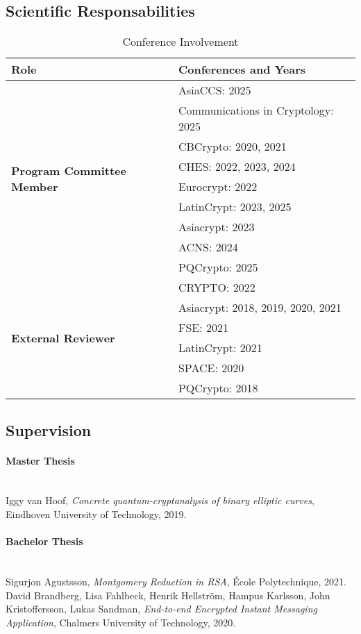 \subsection*{Scientific Responsabilities}
\begin{table}[h]
    \centering
     \caption{Conference Involvement}
    \label{tab:conference_involvement}
    \renewcommand{\arraystretch}{1.3}
    \setlength{\tabcolsep}{10pt}
    \begin{tabular}{l|l}
        \toprule
        \textbf{Role} & \textbf{Conferences and Years} \\
        \midrule
        \multirow{9}{*}{\textbf{Program Committee Member}} & AsiaCCS: 2025 \\
        & Communications in Cryptology: 2025 \\
        & CBCrypto: 2020, 2021 \\
        & CHES: 2022, 2023, 2024 \\
        & Eurocrypt: 2022 \\
        & LatinCrypt: 2023, 2025 \\
        & Asiacrypt: 2023 \\
        & ACNS: 2024 \\
        & PQCrypto: 2025 \\
        \midrule
        \multirow{6}{*}{\textbf{External Reviewer}} & CRYPTO: 2022 \\
        & Asiacrypt: 2018, 2019, 2020, 2021 \\
        & FSE: 2021 \\
        & LatinCrypt: 2021 \\
        & SPACE: 2020 \\
        & PQCrypto: 2018 \\
        \bottomrule
    \end{tabular}
\end{table}

\subsection*{Supervision}
\paragraph{Master Thesis}
~\\
Iggy van Hoof, \textit{Concrete quantum-cryptanalysis of binary elliptic curves}, Eindhoven University of Technology, 2019.

\paragraph{Bachelor Thesis}
~\\
Sigurjon Agustsson, \textit{Montgomery Reduction in RSA}, École Polytechnique, 2021.
~\\
David Brandberg, Lisa Fahlbeck, Henrik Hellstr\"om, Hampus Karlsson, John Kristoffersson, Lukas Sandman, \textit{End-to-end Encrypted Instant Messaging Application}, Chalmers University of Technology, 2020.

